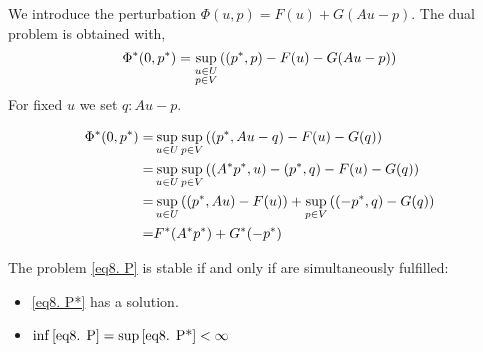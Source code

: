  We introduce the perturbation $\Phi(u, p) = F(u)+G(Au-p)$. The dual problem is obtained with,
 \[
	 {\Phi}^{\ast}(0, {p}^{\ast})=\sup_{\substack{u\in U\\ p \in V} }\left( ({p}^{\ast},p)-F(u)-G(Au-p)\right)
 \]
 For fixed $u$ we set $q: Au -p$.
 
 \begin{align*}
 {\Phi}^{\ast}(0, {p}^{\ast})=&\sup_{u\in U} \sup_{p\in V} \left(\left({p}^{\ast}, Au-q\right)-F(u)-G(q)\right)\\
 =&\sup_{u\in U} \sup_{p\in V} \left(\left({A}^{\ast}{p}^{\ast}, u\right)-({p}^{\ast}, q)-F(u)-G(q)\right)\\
 =&\sup_{u\in U}  \left(\left({p}^{\ast}, Au\right)-F(u)\right)+\sup_{p\in V}\left((-{p}^{\ast},q)-G(q)\right)\\
 =&{F}^{\ast}({A}^{\ast}{p}^{\ast})+{G}^{\ast}(-{p}^{\ast})
 \end{align*}
 
\begin{theorem} [Duality]
	The problem \eqref{eq8. P} is stable if and only if are simultaneously fulfilled:
	\begin{itemize}
		\item \eqref{eq8. P*} has a solution.
		\item $\inf\eqref{eq8. P} = \sup\eqref{eq8. P*} < \infty$
	\end{itemize} 
\end{theorem}